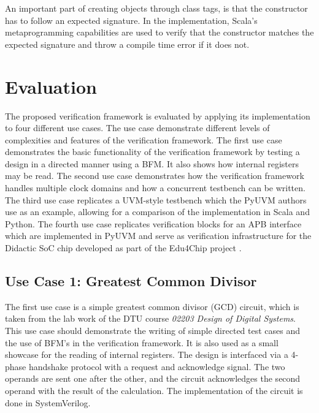 An important part of creating objects through class tags, is that the constructor has to follow an expected signature. In the implementation, Scala's metaprogramming capabilities are used to verify that the constructor matches the expected signature and throw a compile time error if it does not.



\chapter{Evaluation}

The proposed verification framework is evaluated by applying its implementation to four different use cases. The use
case demonstrate different levels of complexities and features of the verification framework. The first use case
demonstrates the basic functionality of the verification framework by testing a design in a directed manner using a
BFM. It also shows how internal registers may be read. The second use case demonstrates how the verification
framework handles multiple clock domains and how a concurrent testbench can be written. The third use case replicates
a UVM-style testbench which the PyUVM authors use as an example, allowing for a comparison of the implementation in
Scala and Python. The fourth use case replicates verification blocks for an APB interface which are implemented in
PyUVM and serve as verification infrastructure for the Didactic SoC chip developed as part of the
Edu4Chip project \cite{edu4chip}. 

\section{Use Case 1: Greatest Common Divisor} %

The first use case is a simple greatest common divisor (GCD) circuit, which is taken from the lab work of the DTU
course \textit{02203 Design of Digital Systems}. This use case should demonstrate the writing of simple directed test
cases and the use of BFM's in the verification framework. It is also used as a small showcase for the reading of
internal registers. The design is interfaced via a 4-phase handshake protocol with a request and acknowledge signal.
The two operands are sent one after the other, and the circuit acknowledges the second operand with the result of the
calculation. The implementation of the circuit is done in SystemVerilog.

